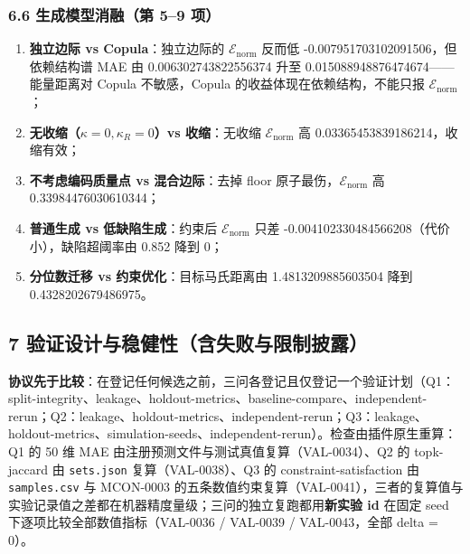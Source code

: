 \documentclass[
  11pt,
]{article}
\providecommand{\tightlist}{%
  \setlength{\itemsep}{0pt}\setlength{\parskip}{0pt}}
\begin{document}
\subsubsection{6.6 生成模型消融（第 5--9
项）}\label{ux751fux6210ux6a21ux578bux6d88ux878dux7b2c-59-ux9879}

\begin{enumerate}
\def\labelenumi{\arabic{enumi}.}
\setcounter{enumi}{4}
\tightlist
\item
  \textbf{独立边际 vs Copula}：独立边际的 \(\mathcal E_{\mathrm{norm}}\)
  反而低 -0.007951703102091506，但依赖结构谱 MAE 由 0.006302743822556374
  升至 0.015088948876474674------能量距离对 Copula 不敏感，Copula
  的收益体现在依赖结构，不能只报 \(\mathcal E_{\mathrm{norm}}\)；
\item
  \textbf{无收缩（\(\kappa=0,\kappa_R=0\)）vs 收缩}：无收缩
  \(\mathcal E_{\mathrm{norm}}\) 高 0.03365453839186214，收缩有效；
\item
  \textbf{不考虑编码质量点 vs 混合边际}：去掉 floor
  原子最伤，\(\mathcal E_{\mathrm{norm}}\) 高 0.33984476030610344；
\item
  \textbf{普通生成 vs 低缺陷生成}：约束后 \(\mathcal E_{\mathrm{norm}}\)
  只差 -0.004102330484566208（代价小），缺陷超阈率由 0.852 降到 0；
\item
  \textbf{分位数迁移 vs 约束优化}：目标马氏距离由 1.4813209885603504
  降到 0.4328202679486975。
\end{enumerate}

\subsection{7
验证设计与稳健性（含失败与限制披露）}\label{ux9a8cux8bc1ux8bbeux8ba1ux4e0eux7a33ux5065ux6027ux542bux5931ux8d25ux4e0eux9650ux5236ux62abux9732}

\textbf{协议先于比较}：在登记任何候选之前，三问各登记且仅登记一个验证计划（Q1：split-integrity、leakage、holdout-metrics、baseline-compare、independent-rerun；Q2：leakage、holdout-metrics、independent-rerun；Q3：leakage、holdout-metrics、simulation-seeds、independent-rerun）。检查由插件原生重算：Q1
的 50 维 MAE 由注册预测文件与测试真值复算（VAL-0034）、Q2 的
topk-jaccard 由 \texttt{sets.json} 复算（VAL-0038）、Q3 的
constraint-satisfaction 由 \texttt{samples.csv} 与 MCON-0003
的五条数值约束复算（VAL-0041），三者的复算值与实验记录值之差都在机器精度量级；三问的独立复跑都用\textbf{新实验
id} 在固定 seed 下逐项比较全部数值指标（VAL-0036 / VAL-0039 /
VAL-0043，全部 delta = 0）。
\end{document}
